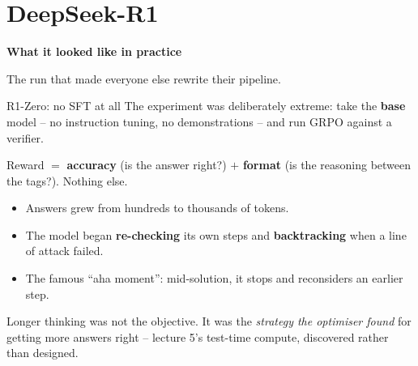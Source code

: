 \documentclass[aspectratio=169]{beamer}
\begin{document}
\section{DeepSeek-R1}
\begin{frame}[plain]
  \begin{center}
    \vskip 1.6cm
    {\Huge\bfseries\color{popblue}What it looked like in practice}

    \vskip 0.6cm
    {\large The run that made everyone else rewrite their pipeline.}
  \end{center}
\end{frame}

\begin{frame}{R1-Zero: no SFT at all}
  \small
  The experiment was deliberately extreme: take the \textbf{base} model -- no instruction
  tuning, no demonstrations -- and run GRPO against a verifier.

  \vskip 6pt
  \begin{center}
  \begin{tcolorbox}[colback=lightbg, colframe=popblue, boxrule=0.7pt, arc=2pt, width=0.86\textwidth]
    \small
    Reward $=$ \textbf{accuracy} (is the answer right?) $+$ \textbf{format} (is the reasoning
    between the tags?). Nothing else.
  \end{tcolorbox}
  \end{center}

  \vskip 6pt
  \begin{tcolorbox}[colback=paramgreen!8, colframe=paramgreen, boxrule=0.6pt, arc=2pt,
                    title={\textbf{What emerged without being asked for}}]
    \small
    \begin{itemize}\itemsep2pt
      \item Answers grew from hundreds to thousands of tokens.
      \item The model began \textbf{re-checking} its own steps and \textbf{backtracking} when a
            line of attack failed.
      \item The famous ``aha moment'': mid-solution, it stops and reconsiders an earlier step.
    \end{itemize}
  \end{tcolorbox}

  \vskip 6pt
  \begin{center}
    \small
    Longer thinking was not the objective. It was the \emph{strategy the optimiser found} for
    getting more answers right -- lecture 5's test-time compute, discovered rather than designed.
  \end{center}
\end{frame}
\end{document}
